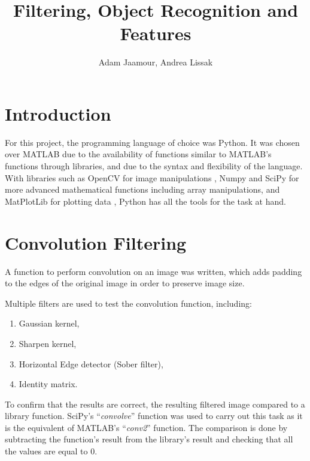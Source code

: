 \documentclass[a4paper,11pt,twocolumn]{article}
\title{Filtering, Object Recognition and Features}
\author{Adam Jaamour, Andrea Lissak}
\begin{document}
\maketitle
\clearpage

\section{Introduction}

For this project, the programming language of choice was Python. It was chosen over MATLAB due to the availability of functions similar to MATLAB's functions through libraries, and due to the syntax and flexibility of the language. With libraries such as OpenCV for image manipulations \citep{opencv}, Numpy \citep{numpy} and SciPy for more advanced mathematical functions including array manipulations, and MatPlotLib for plotting data \citet{matplotlib}, Python has all the tools for the task at hand.


\section{Convolution Filtering}

A function to perform convolution on an image was written, which adds padding to the edges of the original image in order to preserve image size.

Multiple filters are used to test the convolution function, including:
\begin{enumerate}
    \item Gaussian kernel,
    \item Sharpen kernel,
    \item Horizontal Edge detector (Sober filter),
    \item Identity matrix.
\end{enumerate}

To confirm that the results are correct, the resulting filtered image compared to a library function. SciPy's ``\textit{convolve}'' function was used to carry out this task \citep{scipy-convolve} as it is the equivalent of MATLAB's ``\textit{conv2}'' function. The comparison is done by subtracting  the function's result from the library's result and checking that all the values are equal to 0.
\end{document}
